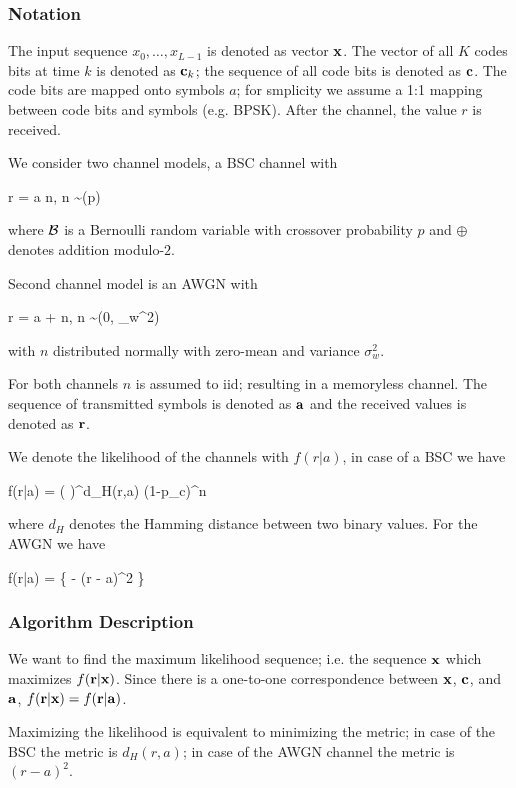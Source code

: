 \subsubsection{Notation}

The input sequence $x_0, \ldots, x_{L-1}$ is denoted as vector $\mathbf{x}$. The vector of all $K$ codes bits at time $k$ is denoted as $\mathbf{c}_k$; the sequence of all code bits is denoted as $\mathbf{c}$. The code bits are mapped onto symbols $a$; for smplicity we assume a 1:1 mapping between code bits and symbols (e.g. BPSK). After the channel, the value $r$ is received.

We consider two channel models, a BSC channel with 

\bee
r = a \oplus n, \quad n \sim \Bc(p)
\eee

where $\mathcal{B}$ is a Bernoulli random variable with crossover probability $p$ and $\oplus$ denotes addition modulo-$2$.

Second channel model is an AWGN with

\bee
r = a + n, \quad n \sim \Nc(0, \sigma_w^2)
\eee

with $n$ distributed normally with zero-mean and variance $\sigma_{w}^2$.

For both channels $n$ is assumed to iid; resulting in a memoryless channel. The sequence of transmitted symbols is denoted as $\mathbf{a}$ and the received values is denoted as $\mathbf{r}$.

We denote the likelihood of the channels with $f(r|a)$, in case of a BSC we have

\bee
f(r|a) = \left( \right)^{d_H(r,a)} (1-p_c)^n
\eee

where $d_H$ denotes the Hamming distance between two binary values. For the AWGN we have


\bee
f(r|a) =  \exp \left\{ -  (r - a)^2 \right\}
\eee

\subsubsection{Algorithm Description}

We want to find the maximum likelihood sequence; i.e. the sequence $\mathbf{x}$ which maximizes $f(\mathbf{r}|\mathbf{x})$. Since there is a one-to-one correspondence between $\mathbf{x}$, $\mathbf{c}$, and $\mathbf{a}$, $f(\mathbf{r}|\mathbf{x}) = f(\mathbf{r}|\mathbf{a})$.

Maximizing the likelihood is equivalent to minimizing the metric; in case of the BSC the metric is $d_H(r,a)$; in case of the AWGN channel the metric is $(r-a)^2$.

